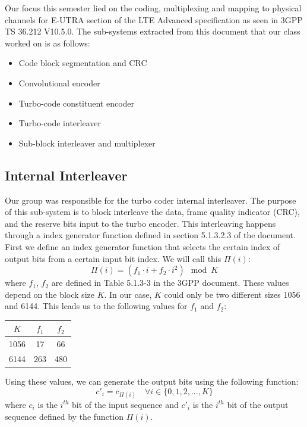 \documentclass[letterpaper, 12pt]{article} %
\begin{document}
        Our focus this semester lied on the coding, multiplexing and mapping to physical channels for E-UTRA section of the LTE Advanced specification as seen in 3GPP TS 36.212 V10.5.0. The sub-systems extracted from this document that our class worked on is as follows:
        \begin{itemize}
            \item Code block segmentation and CRC
            \item Convolutional encoder
            \item Turbo-code constituent encoder
            \item Turbo-code interleaver
            \item Sub-block interleaver and multiplexer 
        \end{itemize}
    \subsection{Internal Interleaver}
        Our group was responsible for the turbo coder internal interleaver. The purpose of this sub-system is to block interleave the data, frame quality indicator (CRC), and the reserve bits input to the turbo encoder. This interleaving happens through a index generator function defined in section 5.1.3.2.3 of the document. First we define an index generator function that selects the certain index of output bits from a certain input bit index. We will call this $\Pi(i)$:
        $$\Pi(i) = (f_1\cdot i + f_2\cdot i^2 )\mod K$$
        where $f_1$, $f_2$ are defined in Table 5.1.3-3 in the 3GPP document. These values depend on the block size $K$. In our case, $K$ could only be two different sizes 1056 and 6144. This leads us to the following values for $f_1$ and $f_2$:
        \renewcommand\arraystretch{1.2}
        \begin{center}
            \begin{tabular}{|c|c|c|}
            \hline
                $K$ & $f_1$ & $f_2$  \\ \hline
                1056 & 17 & 66 \\ \hline 
                6144 & 263 & 480 \\ \hline
            \end{tabular}
        \end{center}
        Using these values, we can generate the output bits using the following function:
        $$c'_i = c_{\Pi(i)} \quad\forall i \in \{0, 1, 2, ..., K\}$$
        where $c_i$ is the $i^{th}$ bit of the input sequence and $c'_i$ is the $i^{th}$ bit of the output sequence defined by the function $\Pi(i)$.
        
\end{document}
